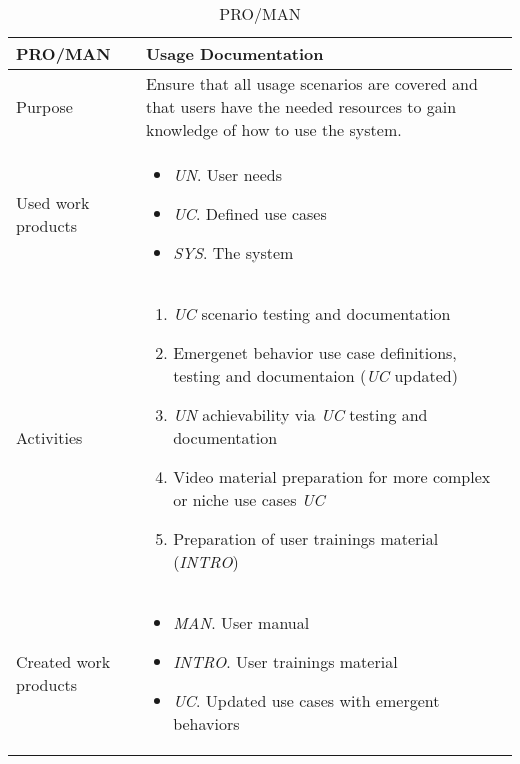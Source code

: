 \begin{table}[h]
\begin{tabular}{l|p{}}
\hline
\textbf{PRO/MAN}               & \textbf{Usage Documentation} \\ \hline
Purpose & Ensure that all usage scenarios are covered and that users have the needed resources to gain knowledge of how to use the system. \\ \hline
Used work products    &      
\begin{itemize}
    \item \textit{UN}. User needs
    \item \textit{UC}. Defined use cases
    \item \textit{SYS}. The system
\end{itemize}
\\ \hline
Activities            &   
\begin{enumerate}
   \item \textit{UC} scenario testing and documentation
   \item Emergenet behavior use case definitions, testing and documentaion (\textit{UC} updated)
   \item \textit{UN} achievability via \textit{UC} testing and documentation
   \item Video material preparation for more complex or niche use cases \textit{UC}
   \item Preparation of user trainings material (\textit{INTRO})
\end{enumerate}
\\ \hline
Created work products &     
\begin{itemize}
    \item \textit{MAN}. User manual
    \item \textit{INTRO}. User trainings material
    \item \textit{UC}. Updated use cases with emergent behaviors
\end{itemize}
\end{tabular}
\caption{PRO/MAN}
\label{pro/man}
\end{table}
\newpage

